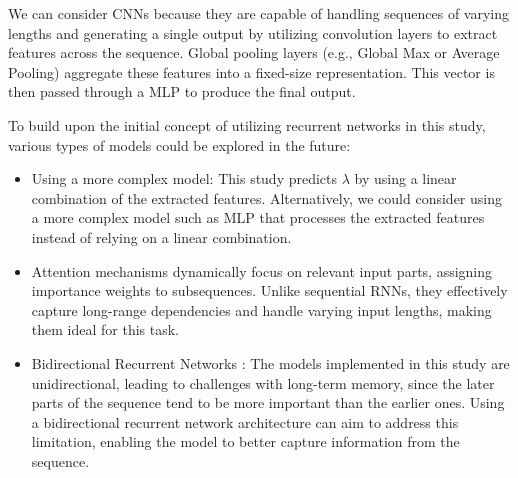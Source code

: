 \documentclass[12pt]{article}
\begin{document}
We can consider CNNs \citep{cnn} because they are capable of handling sequences of varying lengths and generating a single output by utilizing convolution layers to extract features across the sequence. 
Global pooling layers (e.g., Global Max or Average Pooling) aggregate these features into a fixed-size representation. This vector is then passed through a MLP to produce the final output.

To build upon the initial concept of utilizing recurrent networks in this study, various types of models could be explored in the future:
\begin{itemize}
    \item Using a more complex model: This study predicts $\lambda$ by using a linear combination of the extracted features. Alternatively, we could consider using a more complex model such as MLP that processes the extracted features instead of relying on a linear combination.
    \item Attention mechanisms \citep{attention} dynamically focus on relevant input parts, assigning importance weights to subsequences. Unlike sequential RNNs, they effectively capture long-range dependencies and handle varying input lengths, making them ideal for this task.
    \item Bidirectional Recurrent Networks \citep{bidirectional}: The models implemented in this study are unidirectional, leading to challenges with long-term memory, since the later parts of the sequence tend to be more important than the earlier ones. Using a bidirectional recurrent network architecture can aim to address this limitation, enabling the model to better capture information from the sequence.
\end{itemize}
\end{document}

